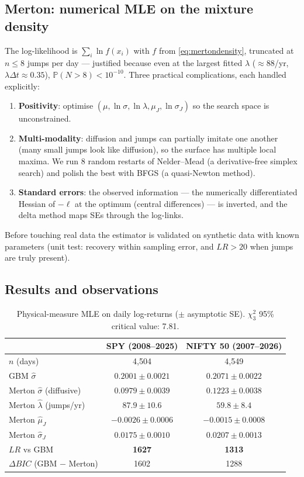 \documentclass[11pt,a4paper]{article}
\newcommand{\Prob}{\mathbb{P}}
\begin{document}
\subsection{Merton: numerical MLE on the mixture density}
The log-likelihood is $\sum_i\ln f(x_i)$ with $f$ from
\eqref{eq:mertondensity}, truncated at $n\le8$ jumps per day --- justified
because even at the largest fitted $\lambda$ ($\approx88$/yr,
$\lambda\Delta t\approx0.35$), $\Prob(N>8)<10^{-10}$. Three practical
complications, each handled explicitly:
\begin{enumerate}[itemsep=2pt]
\item \textbf{Positivity}: optimise $(\mu,\ln\sigma,\ln\lambda,\mu_J,
  \ln\sigma_J)$ so the search space is unconstrained.
\item \textbf{Multi-modality}: diffusion and jumps can partially imitate one
  another (many small jumps look like diffusion), so the surface has multiple
  local maxima. We run 8 random restarts of Nelder--Mead (a derivative-free
  simplex search) and polish the best with BFGS (a quasi-Newton method).
\item \textbf{Standard errors}: the observed information --- the numerically
  differentiated Hessian of $-\ell$ at the optimum (central differences) ---
  is inverted, and the delta method maps SEs through the log-links.
\end{enumerate}
Before touching real data the estimator is validated on synthetic data with
known parameters (unit test: recovery within sampling error, and $LR>20$ when
jumps are truly present).

\subsection{Results and observations}
\label{sec:physobs}

\begin{table}[h]
\centering\small
\caption{Physical-measure MLE on daily log-returns ($\pm$ asymptotic SE).
$\chi^2_3$ 95\% critical value: 7.81.}
\label{tab:physical}
\begin{tabular}{lcc}
\toprule
 & \textbf{SPY (2008--2025)} & \textbf{NIFTY 50 (2007--2026)} \\
\midrule
$n$ (days) & 4{,}504 & 4{,}549 \\
GBM $\hat\sigma$ & $0.2001\pm0.0021$ & $0.2071\pm0.0022$ \\
Merton $\hat\sigma$ (diffusive) & $0.0979\pm0.0039$ & $0.1223\pm0.0038$ \\
Merton $\hat\lambda$ (jumps/yr) & $87.9\pm10.6$ & $59.8\pm8.4$ \\
Merton $\hat\mu_J$ & $-0.0026\pm0.0006$ & $-0.0015\pm0.0008$ \\
Merton $\hat\sigma_J$ & $0.0175\pm0.0010$ & $0.0207\pm0.0013$ \\
$LR$ vs GBM & \textbf{1627} & \textbf{1313} \\
$\Delta BIC$ (GBM $-$ Merton) & 1602 & 1288 \\
\bottomrule
\end{tabular}
\end{table}
\end{document}
